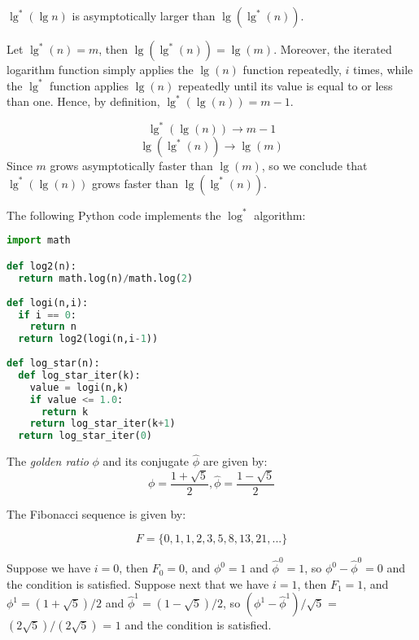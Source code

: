 \documentclass[a4paper,12pt]{article}
\begin{document}
$\lg^*(\lg n)$ is asymptotically larger than $\lg(\lg^*(n))$. 

\vspace{2mm}
Let $\lg^*(n)= m$, then $\lg(\lg^*(n)) = \lg (m)$. Moreover, the iterated logarithm function simply applies the $\lg(n)$ function repeatedly, $i$ times, while the $\lg^*$ function applies $\lg(n)$ repeatedly until its value is equal to or less than one. Hence, by definition, $\lg^*(\lg(n))=m-1$.

\[ \lg^*(\lg(n)) \rightarrow m-1 \]
\[ \lg(\lg^*(n)) \rightarrow \lg(m) \]
Since $m$ grows asymptotically faster than $\lg(m)$, so we conclude that $\lg^*(\lg(n))$ grows faster than $\lg(\lg^*(n))$.

The following Python code implements the $\log^*$ algorithm:
\begin{lstlisting}[language=Python]
import math

def log2(n):
  return math.log(n)/math.log(2)
  
def logi(n,i):
  if i == 0:
    return n
  return log2(logi(n,i-1))
  
def log_star(n):
  def log_star_iter(k):
    value = logi(n,k)
    if value <= 1.0:
      return k
    return log_star_iter(k+1)
  return log_star_iter(0)
\end{lstlisting}

\vspace{2mm}

The \textit{golden ratio}  $\phi$ and its conjugate $\hat{\phi}$ are given by:
\[ \phi = \frac{1 + \sqrt{5}}{2}, \hat{\phi} =  \frac{1-\sqrt{5}}{2} \]

The Fibonacci sequence is given by: 

\[ F = \{0, 1, 1, 2, 3, 5, 8, 13, 21, ...\} \]

Suppose we have $i=0$, then $F_0 = 0$, and $\phi^0=1$ and $\hat{\phi}^0 =1$, so $\phi^0 - \hat{\phi}^0=0$ and the condition is satisfied. Suppose next that we have $i=1$, then $F_1 = 1$, and $\phi^1 = (1+\sqrt{5})/2$ and $\hat{\phi}^1 = (1 -\sqrt{5})/2$, so $(\phi^1 - \hat{\phi}^1)/\sqrt{5}$ = $(2\sqrt{5})/(2\sqrt{5})$ = $1$ and the condition is satisfied. 
\end{document}
